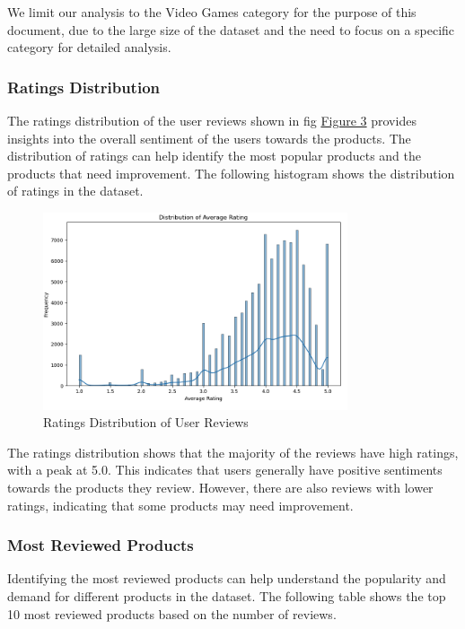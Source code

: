 \documentclass{article}
\begin{document}
We limit our analysis to the Video Games category for the purpose of this document, due to the large size of the dataset and the need to focus on a specific category for detailed analysis.

\subsubsection{Ratings Distribution}

The ratings distribution of the user reviews shown in fig \hyperref[fig:ratings_distribution]{Figure 3}  provides insights into the overall sentiment of the users towards the products. The distribution of ratings can help identify the most popular products and the products that need improvement. The following histogram shows the distribution of ratings in the dataset.

\begin{figure}[hbt!]
  \centering
  \includegraphics[width=0.8\textwidth]{img/avg_rating.png}
  \caption{Ratings Distribution of User Reviews}
  \label{fig:ratings_distribution}
  \end{figure}

The ratings distribution shows that the majority of the reviews have high ratings, with a peak at 5.0. This indicates that users generally have positive sentiments towards the products they review. However, there are also reviews with lower ratings, indicating that some products may need improvement.

\subsubsection{Most Reviewed Products}

Identifying the most reviewed products can help understand the popularity and demand for different products in the dataset. The following table shows the top 10 most reviewed products based on the number of reviews.
\end{document}
